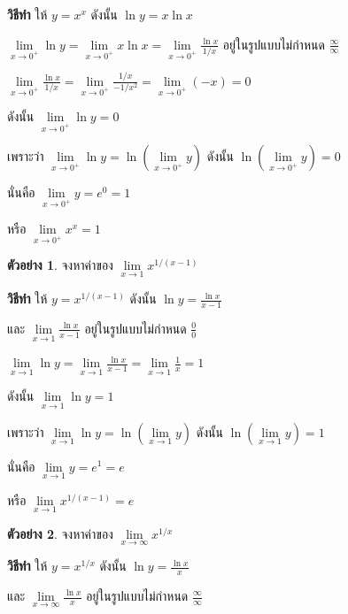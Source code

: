 \documentclass[
]{book}
\theoremstyle{definition}
\theoremstyle{definition}
\newtheorem{example}{ตัวอย่าง}[chapter]
\theoremstyle{definition}
\theoremstyle{definition}
\theoremstyle{remark}
\begin{document}
\textbf{วิธีทำ} ให้ \(y=x^x\) ดังนั้น \(\ln y=x\ln x\)

\(\displaystyle \mathop {\lim }\limits_{x\to 0^+} \ln y=\mathop {\lim
}\limits_{x\to 0^+}
x\ln x=\mathop {\lim }\limits_{x\to 0^+} \frac{\ln x}{1/x}\)
อยู่ในรูปแบบไม่กำหนด \(\displaystyle \frac{\infty }{\infty }\)

\(\displaystyle \mathop {\lim }\limits_{x\to 0^+} \frac{\ln x}{1/x}=\mathop
{\lim
}\limits_{x\to 0^+} \frac{1/x}{-1/x^2}=\mathop {\lim }\limits_{x\to 0^+}
(-x)=0\)

ดังนั้น \(\mathop {\lim }\limits_{x\to 0^+} \ln y=0\)

เพราะว่า \(\mathop {\lim }\limits_{x\to 0^+} \ln y=\ln (\mathop {\lim
}\limits_{x\to 0^+} y)\) ดังนั้น \(\ln (\mathop {\lim }\limits_{x\to 0^+}
y)=0\)

นั่นคือ \(\mathop {\lim }\limits_{x\to 0^+} y=e^0=1\)

หรือ \(\mathop {\lim }\limits_{x\to 0^+} x^x=1\)

\begin{example}
จงหาค่าของ \(\mathop {\lim }\limits_{x\to 1} x^{1/(x-1)}\)
\end{example}

\textbf{วิธีทำ} ให้ \(y=x^{1/(x-1)}\) ดังนั้น \(\displaystyle \ln y=\frac{\ln x}{x-1}\)

และ \(\displaystyle \mathop {\lim }\limits_{x\to 1} \frac{\ln x}{x-1}\)
อยู่ในรูปแบบไม่กำหนด \(\displaystyle \frac{0}{0}\)

\(\displaystyle \mathop {\lim }\limits_{x\to 1} \ln y=\mathop {\lim
}\limits_{x\to 1}
\frac{\ln x}{x-1}=\mathop {\lim }\limits_{x\to 1} \frac{1}{x}=1\)

ดังนั้น \(\mathop {\lim }\limits_{x\to 1} \ln y=1\)

เพราะว่า \(\mathop {\lim }\limits_{x\to 1} \ln y=\ln (\mathop {\lim
}\limits_{x\to 1} y)\) ดังนั้น \(\ln (\mathop {\lim }\limits_{x\to 1} y)=1\)

นั่นคือ \(\mathop {\lim }\limits_{x\to 1} y=e^1=e\)

หรือ \(\mathop {\lim }\limits_{x\to 1} x^{1/(x-1)}=e\)

\begin{example}
จงหาค่าของ \(\mathop {\lim }\limits_{x\to \infty } x^{1/x}\)
\end{example}

\textbf{วิธีทำ} ให้ \(y=x^{1/x}\) ดังนั้น \(\displaystyle \ln y=\frac{\ln x}{x}\)

และ
\(\displaystyle \mathop {\lim }\limits_{x\to \infty } \frac{\ln x}{x}\)
อยู่ในรูปแบบไม่กำหนด \(\displaystyle \frac{\infty }{\infty }\)
\end{document}

